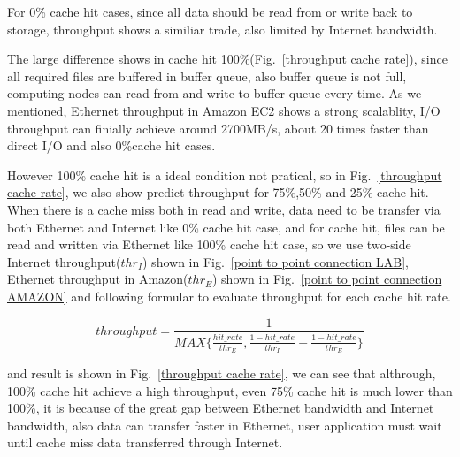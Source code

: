 For 0\% cache hit cases, since all data should be read from or write back to storage, throughput shows a similiar trade, also limited by Internet bandwidth.

The large difference shows in cache hit 100\%(Fig.~\ref{throughput cache rate}), since all required files are buffered in buffer queue, also buffer queue is not full, computing nodes can read from and write to buffer queue every time.
As we mentioned, Ethernet throughput in Amazon EC2 shows a strong scalablity, I/O throughput can finially achieve around 2700MB/s, about 20 times faster than direct I/O and also 0\%cache hit cases.

However 100\% cache hit is a ideal condition not pratical, so in Fig.~\ref{throughput cache rate}, we also show predict throughput for 75\%,50\% and 25\% cache hit.
When there is a cache miss both in read and write, data need to be transfer via both Ethernet and Internet like 0\% cache hit case, and for cache hit, files can be read and written via Ethernet like 100\% cache hit case, so we use two-side Internet throughput($thr_I$) shown in Fig.~\ref{point to point connection LAB}, Ethernet throughput in Amazon($thr_E$) shown in Fig.~\ref{point to point connection AMAZON} and following formular to evaluate throughput for each cache hit rate.

\[throughput=\frac{1}{MAX\{\frac{{hit\_rate}}{thr_E},\frac{1-hit\_rate}{thr_I}+\frac{1-hit\_rate}{thr_E}\}}\]

and result is shown in Fig.~\ref{throughput cache rate}, we can see that althrough, 100\% cache hit achieve a high throughput, even 75\% cache hit is much lower than 100\%, it is because of the great gap between Ethernet bandwidth and Internet bandwidth, also data can transfer faster in Ethernet, user application must wait until cache miss data transferred through Internet.




